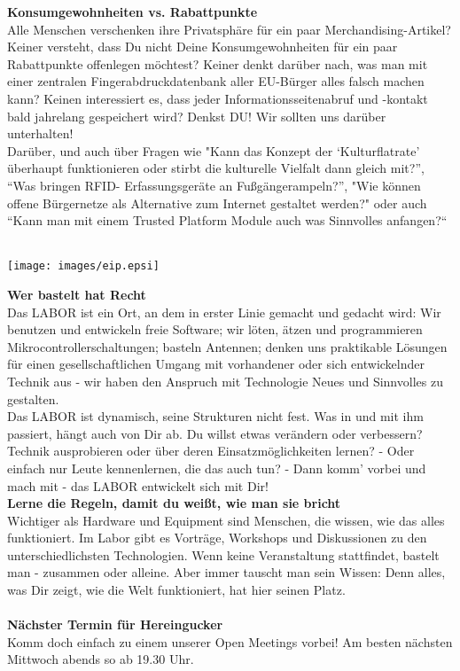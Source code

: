\documentclass[10pt,landscape,a4paper]{article}
\begin{document}
\begin{multicols}{3}
{\bf Konsumgewohnheiten vs. Rabattpunkte}\\
Alle Menschen verschenken ihre Privatsph\"are f\"ur ein paar
Merchandising-Artikel? Keiner versteht, dass Du nicht Deine
Konsumgewohnheiten f\"ur ein paar Rabattpunkte offenlegen m\"ochtest? Keiner
denkt dar\"uber nach, was man mit einer zentralen Fingerabdruckdatenbank
aller EU-B\"urger alles falsch machen kann? Keinen interessiert es, dass
jeder Informationsseitenabruf und -kontakt bald jahrelang gespeichert
wird? Denkst DU! Wir sollten uns dar\"uber unterhalten!\\
Dar\"uber, und auch \"uber Fragen wie "Kann das Konzept der
‘Kulturﬂatrate’ \"uberhaupt funktionieren oder stirbt die kulturelle
Vielfalt dann gleich mit?”, “Was bringen RFID- Erfassungsger\"ate an
Fußg\"angerampeln?”, "Wie k\"onnen offene B\"urgernetze als Alternative
zum Internet gestaltet werden?" oder auch “Kann man mit einem Trusted
Platform Module auch was Sinnvolles anfangen?“\\
\\
\begin{center}
\centering \texttt{[image: images/eip.epsi]}
\end{center}

\vskip 2cm

{\bf Wer bastelt hat Recht}\\
Das LABOR ist ein Ort, an dem in erster Linie gemacht und gedacht wird:
Wir benutzen und entwickeln freie Software; wir l\"oten, \"atzen und
programmieren Mikrocontrollerschaltungen; basteln Antennen; denken uns
praktikable L\"osungen f\"ur einen gesellschaftlichen Umgang mit vorhandener
oder sich entwickelnder Technik aus - wir haben den Anspruch mit Technologie
Neues und Sinnvolles zu gestalten.\\
Das LABOR ist dynamisch, seine Strukturen nicht fest. Was in und mit
ihm passiert, h\"angt auch von Dir ab. Du willst etwas ver\"andern oder
verbessern? Technik ausprobieren oder \"uber deren Einsatzm\"oglichkeiten
lernen? - Oder einfach nur Leute kennenlernen, die das auch tun? - Dann
komm' vorbei und mach mit - das LABOR entwickelt sich mit Dir!\\
{\bf Lerne die Regeln, damit du weißt, wie man sie bricht}\\
Wichtiger als Hardware und Equipment sind Menschen, die wissen, wie das alles
funktioniert. Im Labor gibt es Vortr\"age, Workshops und Diskussionen zu
den unterschiedlichsten Technologien. Wenn keine Veranstaltung stattﬁndet,
bastelt man - zusammen oder alleine. Aber immer tauscht man sein Wissen: Denn
alles, was Dir zeigt, wie die Welt funktioniert, hat hier seinen Platz.\\
\\
{\bf N\"achster Termin f\"ur Hereingucker}\\
Komm doch einfach zu einem unserer Open Meetings vorbei! Am besten n\"achsten
Mittwoch abends so ab 19.30 Uhr.\\


\end{multicols}
\end{document}
